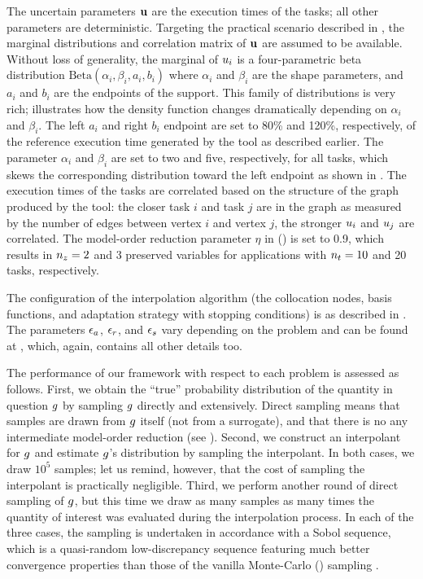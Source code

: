 
The uncertain parameters $\mathbf{u}$ are the execution times of the tasks; all other
parameters are deterministic. Targeting the practical scenario described in
, the marginal distributions and correlation matrix of $\mathbf{u}$
are assumed to be available. Without loss of generality, the marginal of $u_i$
is a four-parametric beta distribution $\text{Beta}(\alpha_i, \beta_i, a_i,
b_i)$ where $\alpha_i$ and $\beta_i$ are the shape parameters, and $a_i$ and
$b_i$ are the endpoints of the support. This family of distributions is very
rich;  illustrates how the density function changes
dramatically depending on $\alpha_i$ and $\beta_i$. The left $a_i$ and right
$b_i$ endpoint are set to 80\% and 120\%, respectively, of the reference
execution time generated by the  tool as described earlier. The
parameter $\alpha_i$ and $\beta_i$ are set to two and five, respectively, for
all tasks, which skews the corresponding distribution toward the left endpoint
as shown in . The execution times of the tasks are correlated
based on the structure of the graph produced by the  tool: the closer
task $i$ and task $j$ are in the graph as measured by the number of edges
between vertex $i$ and vertex $j$, the stronger $u_i$ and $u_j$ are
correlated. The model-order reduction parameter $\eta$ in 
() is set to 0.9, which results in ${n_z} = 2$ and 3 preserved
variables for applications with ${n_t} = 10$ and 20 tasks, respectively.

The configuration of the interpolation algorithm (the collocation nodes, basis
functions, and adaptation strategy with stopping conditions) is as described in
. The parameters $\epsilon_a$, $\epsilon_r$, and $\epsilon_s$ vary
depending on the problem and can be found at \cite{sources}, which, again,
contains all other details too.

The performance of our framework with respect to each problem is assessed as
follows. First, we obtain the ``true'' probability distribution of the quantity
in question $g$ by sampling $g$ directly and extensively. Direct sampling
means that samples are drawn from $g$ itself (not from a surrogate), and that
there is no any intermediate model-order reduction (see ).
Second, we construct an interpolant for $g$ and estimate $g$'s distribution by
sampling the interpolant. In both cases, we draw $10^5$ samples; let us remind,
however, that the cost of sampling the interpolant is practically negligible.
Third, we perform another round of direct sampling of $g$, but this time we
draw as many samples as many times the quantity of interest was evaluated during
the interpolation process. In each of the three cases, the sampling is
undertaken in accordance with a Sobol sequence, which is a quasi-random
low-discrepancy sequence featuring much better convergence properties than those
of the vanilla Monte-Carlo () sampling \cite{joe2008}.

